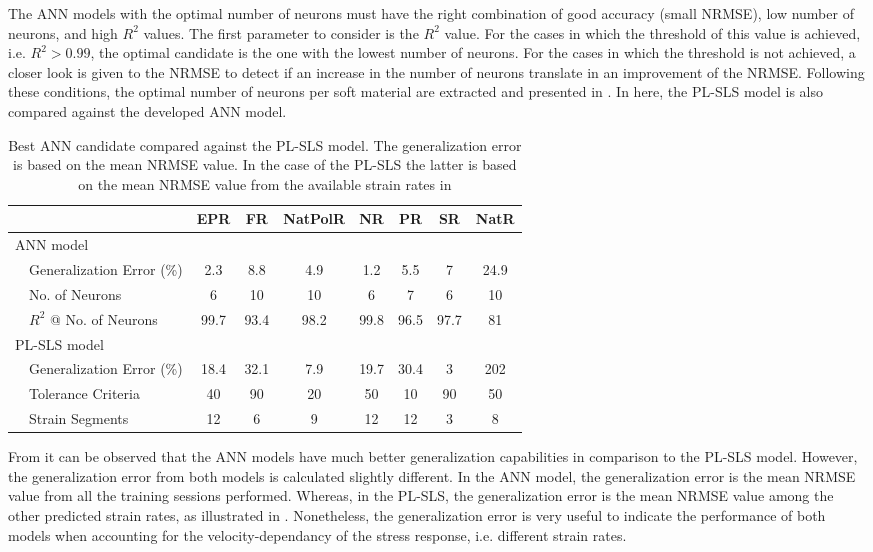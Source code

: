The ANN models with the optimal number of neurons must have the right combination of good accuracy (small NRMSE), low number of neurons, and high $R^2$ values. The first parameter to consider is the $R^2$ value. For the cases in which the threshold of this value is achieved, i.e. $R^2 > 0.99$, the optimal candidate is the one with the lowest number of neurons. For the cases in which the threshold is not achieved, a closer look is given to the NRMSE to detect if an increase in the number of neurons translate in an improvement of the NRMSE. Following these conditions, the optimal number of neurons per soft material are extracted and presented in . In here, the PL-SLS model is also compared against the developed ANN model.

\begin{table}[htb!]
	\centering
	\caption{Best ANN candidate compared against the PL-SLS model. The generalization error is based on the mean NRMSE value. In the case of the PL-SLS the latter is based on the mean NRMSE value from the available strain rates in }
	\begin{tabular}{p{1em} l ccccccc}
		\toprule
		&                   & EPR   & FR    & NatPolR & NR  & PR    & SR    & NatR\\
		\hline
		\multicolumn{9}{l}{ANN model}\\
		&Generalization Error (\%)          & 2.3   & 8.8   & 4.9   & 1.2   &5.5    & 7     &   24.9\\
		&No. of Neurons                     & 6     & 10    & 10    & 6     &7      & 6     &   10\\
		&$R^2$ @ No. of Neurons             & 99.7  & 93.4  & 98.2  & 99.8  &96.5   & 97.7  &   81\\
		\midrule
		\multicolumn{9}{l}{PL-SLS model}\\
		&Generalization Error (\%)          & 18.4    & 32.1  & 7.9   & 19.7  & 30.4  & 3   & 202\\
		&Tolerance Criteria                 & 40    & 90    & 20    & 50    & 10    & 90    & 50\\
		&Strain Segments                    & 12    & 6     & 9     & 12    & 12    & 3     & 8\\
		\bottomrule
	\end{tabular}
	\label{tbl:ANNvsSLS}
\end{table}

From  it can be observed that the ANN models have much better generalization capabilities in comparison to the PL-SLS model. However, the generalization error from both models is calculated slightly different. In the ANN model, the generalization error is the mean NRMSE value from all the training sessions performed. Whereas, in the PL-SLS, the generalization error is the mean NRMSE value among the other predicted strain rates, as illustrated in . Nonetheless, the generalization error is very useful to indicate the performance of both models when accounting for the velocity-dependancy of the stress response, i.e. different strain rates.

